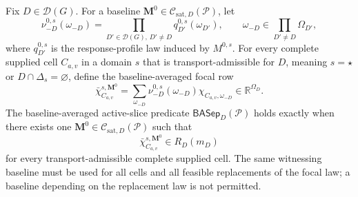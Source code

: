 Fix \(D\in\mathcal D(G)\).  For a baseline \(\mathbf M^0\in\mathcal C_{\mathrm{sat},D}(\mathcal P)\), let
\[
\nu_{-D}^{0,s}(\omega_{-D})
=\prod_{D'\in\mathcal D(G),\,D'\ne D}q_{D'}^{0,s}(\omega_{D'}),
\qquad
\omega_{-D}\in\prod_{D'\ne D}\Omega_{D'},
\]
where \(q_{D'}^{0,s}\) is the response-profile law induced by \(M^{0,s}\).  For every complete supplied cell \(C_{a,v}\) in a domain \(s\) that is transport-admissible for \(D\), meaning \(s=\star\) or \(D\cap\Delta_s=\varnothing\), define the baseline-averaged focal row
\[
\bar\chi_{C_{a,v}}^{s,\mathbf M^0}
=\sum_{\omega_{-D}}
\nu_{-D}^{0,s}(\omega_{-D})
\chi_{C_{a,v},\omega_{-D}}
\in\mathbb R^{\Omega_D}.
\]
The baseline-averaged active-slice predicate \(\mathsf{BASep}_D(\mathcal P)\) holds exactly when there exists one \(\mathbf M^0\in\mathcal C_{\mathrm{sat},D}(\mathcal P)\) such that
\[
\bar\chi_{C_{a,v}}^{s,\mathbf M^0}\in R_D(m_D)
\]
for every transport-admissible complete supplied cell.  The same witnessing baseline must be used for all cells and all feasible replacements of the focal law; a baseline depending on the replacement law is not permitted.